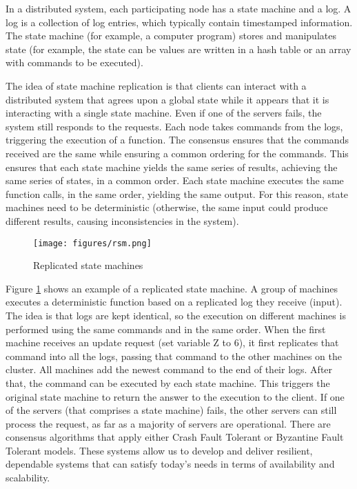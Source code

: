 \documentclass[12pt,a4paper]{article}
\begin{document}
In a distributed system, each participating node has a state machine and a log. A log is a collection of log entries, which typically contain timestamped information. The state machine (for example, a computer program) stores and manipulates state (for example, the state can be values are written in a hash table or an array with commands to be executed). 

The idea of state machine replication is that clients can interact with a distributed system that agrees upon a global state while it appears that it is interacting with a single state machine. Even if one of the servers fails, the system still responds to the requests. Each node takes commands from the logs, triggering the execution of a function. The consensus ensures that the commands received are the same while ensuring a common ordering for the commands. This ensures that each state machine yields the same series of results, achieving the same series of states, in a common order. Each state machine executes the same function calls, in the same order, yielding the same output. For this reason, state machines need to be deterministic (otherwise, the same input could produce different results, causing inconsistencies in the system).
 
 \begin{figure}[h!]
    \centering
    \texttt{[image: figures/rsm.png]}
    \caption{Replicated state machines \cite{replicated}}
    \label{fig:rms}
\end{figure}

Figure \ref{fig:rms} shows an example of a replicated state machine. A group of machines executes a deterministic function based on a replicated log they receive (input). The idea is that logs are kept identical, so the execution on different machines is performed using the same commands and in the same order. When the first machine receives an update request (set variable Z to 6), it first replicates that command into all the logs, passing that command to the other machines on the cluster. All machines add the newest command to the end of their logs. After that, the command can be executed by each state machine. This triggers the original state machine to return the answer to the execution to the client. If one of the servers (that comprises a state machine) fails, the other servers can still process the request, as far as a majority of servers are operational. There are consensus algorithms that apply either Crash Fault Tolerant or Byzantine Fault Tolerant models. These systems allow us to develop and deliver resilient, dependable systems that can satisfy today's needs in terms of availability and scalability.
\end{document}

